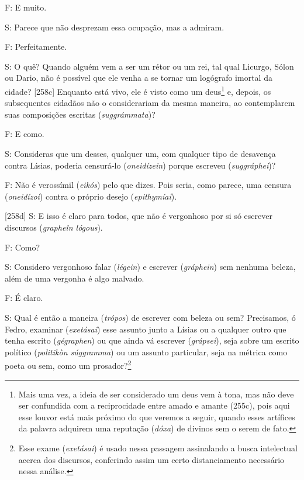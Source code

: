 F: E muito.

S: Parece que não desprezam essa ocupação, mas a admiram.

F: Perfeitamente.

S: O quê? Quando alguém vem a ser um rétor ou um rei, tal qual Licurgo,
Sólon ou Dario, não é possível que ele venha a se tornar um logógrafo
imortal da cidade? {[}258c{]} Enquanto está vivo, ele é visto como um
deus\footnote{Mais uma vez, a ideia de ser considerado um deus vem à
  tona, mas não deve ser confundida com a reciprocidade entre amado e
  amante (255c), pois aqui esse louvor está mais próximo do que veremos
  a seguir, quando esses artífices da palavra adquirem uma reputação
  (\emph{dóxa}) de divinos sem o serem de fato.} e, depois, os
subsequentes cidadãos não o considerariam da mesma maneira, ao
contemplarem suas composições escritas (\emph{suggrámmata})?

F: E como.

S: Consideras que um desses, qualquer um, com qualquer tipo de desavença
contra Lísias, poderia censurá-lo (\emph{oneidízein}) porque escreveu
(\emph{suggráphei})?

F: Não é verossímil (\emph{eikós}) pelo que dizes. Pois seria, como
parece, uma censura (\emph{oneidízoi}) contra o próprio desejo
(\emph{epithymíai}).

{[}258d{]} S: E isso é claro para todos, que não é vergonhoso por si só
escrever discursos (\emph{grapheîn lógous}).

F: Como?

S: Considero vergonhoso falar (\emph{légein}) e escrever
(\emph{gráphein}) sem nenhuma beleza, além de uma vergonha é algo
malvado.

F: É claro.

S: Qual é então a maneira (\emph{trópos}) de escrever com beleza ou sem?
Precisamos, ó Fedro, examinar (\emph{exetásai}) esse assunto junto a
Lísias ou a qualquer outro que tenha escrito (\emph{gégraphen}) ou que
ainda vá escrever (\emph{grápsei}), seja sobre um escrito político
(\emph{politikòn súggramma}) ou um assunto particular, seja na métrica
como poeta ou sem, como um prosador?\footnote{Esse exame
  (\emph{exetásai}) é usado nessa passagem assinalando a busca
  intelectual acerca dos discursos, conferindo assim um certo
  distanciamento necessário nessa análise.}

